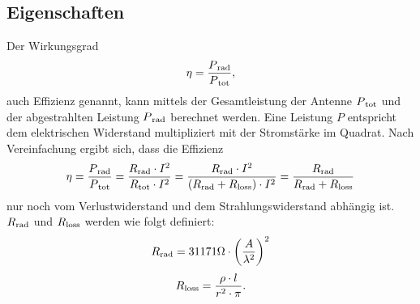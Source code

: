 \subsection{Eigenschaften\label{antennen:antennenEigenschaften}}
Der Wirkungsgrad
\begin{equation}
	\eta=\frac{P\textsubscript{rad}}{P\textsubscript{tot}},
	\label{antennen:Wirkungsgrad}
\end{equation}
auch Effizienz genannt, kann mittels der Gesamtleistung der Antenne $P\textsubscript{tot}$ und der abgestrahlten Leistung $P\textsubscript{rad}$ berechnet werden. Eine Leistung $P$ entspricht dem elektrischen Widerstand multipliziert mit der Stromstärke im Quadrat. Nach Vereinfachung ergibt sich, dass die Effizienz
\begin{equation}
	\eta=\frac{P\textsubscript{rad}}{P\textsubscript{tot}}=\frac{R\textsubscript{rad}\cdot{I^2}}{R\textsubscript{tot}\cdot{I^2}}=\frac{R\textsubscript{rad}\cdot{I^2}}{(R\textsubscript{rad}+R\textsubscript{loss})\cdot{I^2}}=\frac{R\textsubscript{rad}}{R\textsubscript{rad}+R\textsubscript{loss}}
	\label{antennen:Wirkungsgradkomplett}
\end{equation}
nur noch vom Verlustwiderstand und dem Strahlungswiderstand abhängig ist. $R\textsubscript{rad}$ und $R\textsubscript{loss}$ werden wie folgt definiert:
\begin{equation}
	R\textsubscript{rad}=31171\Omega\cdot{\bigg(\frac{A}{\lambda^2}\bigg)^2}
	\label{antennen:Rrad}
\end{equation}
\begin{equation}
	R\textsubscript{loss}=\frac{\rho\cdot{l}}{r^2\cdot{\pi}}.
	\label{antennen:Rloss}
\end{equation}

